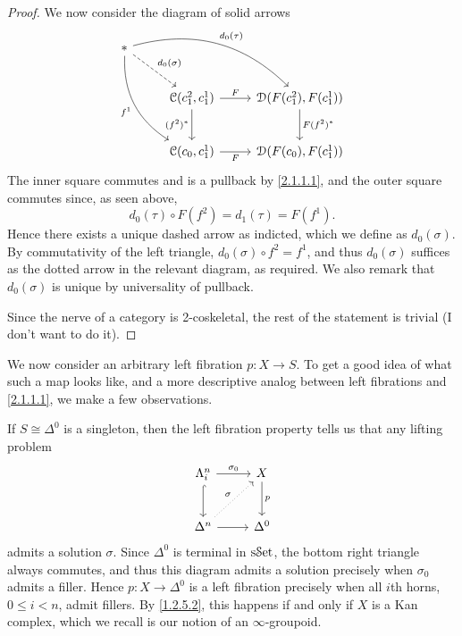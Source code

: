 \begin{proof}
	We now consider the diagram of solid arrows
	\[\begin{tikzcd}[row sep = 2.5em, column sep = 2.5em]
	* \ar[" d_0(\tau ) ", bend left, drr] \ar[" f^1 "', bend right, ddr] \ar[" d_0(\sigma ) ", dashed, dr]  &  &  \\
														& \mathcal{C} (c_1^2,c_1^1)\ar[" F ", r] \ar[" (f^2)^* "', d]  & \mathcal{D}(F(c_1^2),F(c_1^1))\ar[" F(f^2)^* ", d]  \\
														& \mathcal{C} (c_0,c_1^1)\ar[" F "', r]  & \mathcal{D}(F(c_0),F(c_1^1))
	\end{tikzcd}\]
	The inner square commutes and is a pullback by \cref{2.1.1.1}, and the outer square commutes since, as seen above,
	\[
		d_0(\tau )\circ F(f^2) = d_1(\tau )=F(f^1)
	.\]
	Hence there exists a unique dashed arrow as indicted, which we define as $d_0(\sigma )$. By commutativity of the left triangle, $d_0(\sigma )\circ f^2=f^1$, and thus $d_0(\sigma )$ suffices as the dotted arrow in the relevant diagram, as required. We also remark that $d_0(\sigma )$ is unique by universality of pullback.

	Since the nerve of a category is 2-coskeletal, the rest of the statement is trivial (I don't want to do it).
\end{proof}

We now consider an arbitrary left fibration $p : X \to S$. To get a good idea of what such a map looks like, and a more descriptive analog between left fibrations and \cref{2.1.1.1}, we make a few observations.

\begin{remark}\label{2.1.1.4}
	If $S\cong \Delta ^0$ is a singleton, then the left fibration property tells us that any lifting problem
	\[\begin{tikzcd}[row sep = 2.5em, column sep = 2.5em]
	\Lambda _i^n \ar[" \sigma _0 ", r] \ar[hook, d]  & X \ar[" p ", d]  \\
	\Delta ^n \ar[" \sigma  ", dotted, ur] \ar[r]  & \Delta ^0
	\end{tikzcd}\]
	admits a solution $\sigma $. Since $\Delta ^0$ is terminal in $\mathrm{s}\mathcal{S}\mathrm{et} $, the bottom right triangle always commutes, and thus this diagram admits a solution precisely when $\sigma_0$ admits a filler. Hence $p : X \to \Delta ^0$ is a left fibration precisely when all $i$th horns, $0\leq i<n$, admit fillers. By \cref{1.2.5.2}, this happens if and only if $X$ is a Kan complex, which we recall is our notion of an $\infty $-groupoid.
\end{remark}

